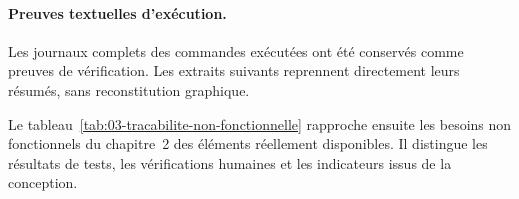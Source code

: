 \paragraph{Preuves textuelles d'exécution.}
Les journaux complets des commandes exécutées ont été conservés comme preuves de vérification. Les extraits suivants reprennent directement leurs résumés, sans reconstitution graphique.

\begin{center}

\vspace{0.8em}

\end{center}

Le tableau~\ref{tab:03-tracabilite-non-fonctionnelle} rapproche ensuite les besoins non fonctionnels du chapitre~2 des éléments réellement disponibles. Il distingue les résultats de tests, les vérifications humaines et les indicateurs issus de la conception.

